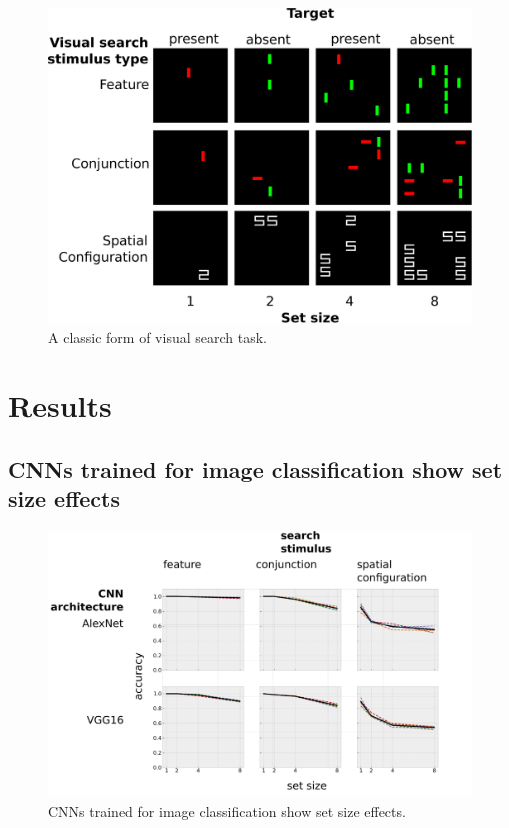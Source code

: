 \documentclass[10pt,letterpaper]{article}
\begin{document}
\begin{figure}[ht]
\begin{center}
\includegraphics[width=\columnwidth]{fig1/fig1.eps}
\end{center}
\caption{A classic form of visual search task.} 
\label{sample-figure}
\end{figure}



\section{Results}

\subsection{CNNs trained for image classification show set size effects}

\begin{figure}[ht]
\begin{center}
\includegraphics[width=\columnwidth]{fig2/fig2.png}
\end{center}
\caption{CNNs trained for image classification show set size effects.} 
\label{sample-figure}
\end{figure}
\end{document}
